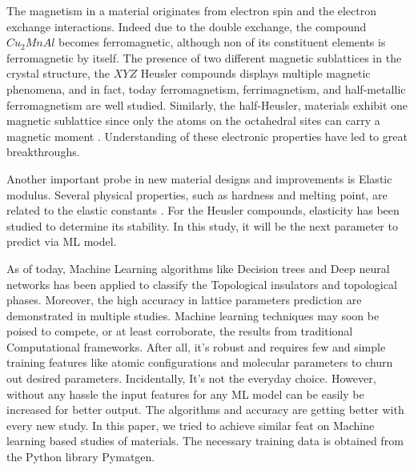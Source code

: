 \documentclass{article}
\begin{document}
The magnetism in a material originates from electron spin and the electron exchange interactions\cite{dietl2009exchange, klitzing:qhe, commins:qhe}. Indeed due to the double exchange, the compound ${Cu_2MnAl}$ becomes ferromagnetic, although non of its constituent elements is ferromagnetic by itself\cite{heusler1903magnetisch}. The presence of two different magnetic sublattices in the crystal structure, the ${XYZ}$ Heusler compounds displays multiple magnetic phenomena, and in fact, today ferromagnetism, ferrimagnetism, and half-metallic ferromagnetism are well studied. Similarly, the half-Heusler, materials exhibit one magnetic sublattice since only the atoms on the octahedral sites can carry a magnetic moment \cite{graf2013magnetic}. Understanding of these electronic properties have led to great breakthroughs. 

Another important probe in new material designs and improvements is Elastic modulus. Several physical properties, such as hardness and melting point, are related to the elastic constants \cite{fine1984elastic, gilman2009chemistry}. For the Heusler compounds, elasticity has been studied to determine its stability\cite{wu2017critical}. In this study, it will be the next parameter to predict via ML model.

As of today, Machine Learning algorithms like Decision trees and Deep neural networks has been applied to classify the Topological insulators\cite{claussen2020detection, andrejevic2020machine} and topological phases\cite{ming2019quantum}. Moreover, the high accuracy in lattice parameters prediction are demonstrated in multiple studies\cite{chonghe2003prediction, jiang2006prediction, zhang2020machine}. Machine learning techniques may soon be poised to compete, or at least corroborate, the results from traditional Computational frameworks. After all, it's robust and requires few and simple training features like atomic configurations and molecular parameters to churn out desired parameters. Incidentally, It's not the everyday choice. However, without any hassle the input features for any ML model can be easily be increased for better output. The algorithms and accuracy are getting better with every new study. In this paper, we tried to achieve similar feat on Machine learning based studies of materials. The necessary training data is obtained from the Python library Pymatgen\cite{ong2013python}.



\end{document}

